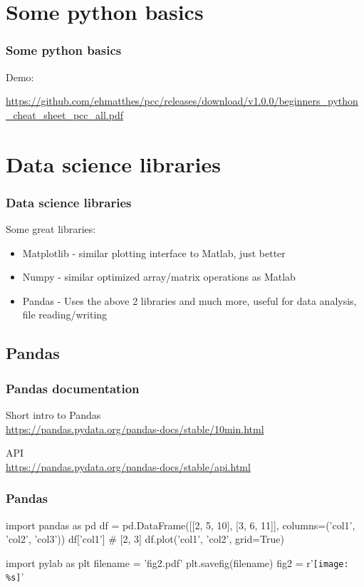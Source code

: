 \documentclass[12pt]{beamer}
\begin{document}
\section{Some python basics}
\begin{frame}[fragile]
\frametitle{Some python basics}
Demo:\\ \begin{small}\url{https://github.com/ehmatthes/pcc/releases/download/v1.0.0/beginners_python_cheat_sheet_pcc_all.pdf}\end{small}
\end{frame}

\section{Data science libraries}
\begin{frame}[fragile]
\frametitle{Data science libraries}
Some great libraries:
\begin{itemize}
\item Matplotlib - similar plotting interface to Matlab, just better
\item Numpy - similar optimized array/matrix operations as Matlab
\item Pandas - Uses the above 2 libraries and much more, useful for data analysis, file reading/writing
\end{itemize}
\end{frame}


\subsection{Pandas}
\begin{frame}[fragile]
\frametitle{Pandas documentation}
Short intro to Pandas\\
\url{https://pandas.pydata.org/pandas-docs/stable/10min.html} \\
\vspace{0.25cm}

API \\
\url{https://pandas.pydata.org/pandas-docs/stable/api.html} \\
\vspace{0.25cm}

\end{frame}


\begin{frame}[fragile]
\frametitle{Pandas}
\begin{pyblock}
import pandas as pd
df = pd.DataFrame([[2, 5, 10], [3, 6, 11]], 
			columns=('col1', 'col2', 'col3'))
df['col1'] #  [2, 3]
df.plot('col1', 'col2', grid=True)
\end{pyblock}
\begin{pycode}
import pylab as plt
filename = 'fig2.pdf'
plt.savefig(filename)
fig2 = r'\texttt{[image: \%s]}' %
\end{pycode}
\end{frame}
\end{document}

